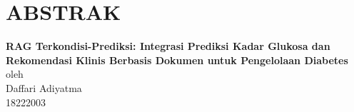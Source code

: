 \chapter*{ABSTRAK}

\begin{center}

    \textbf{RAG Terkondisi-Prediksi: Integrasi Prediksi Kadar Glukosa dan Rekomendasi Klinis Berbasis Dokumen untuk Pengelolaan Diabetes} \\
    \vspace{0.4cm}
    oleh \\
    \vspace{0.4cm}
    Daffari Adiyatma\\
    18222003\\
\end{center}


